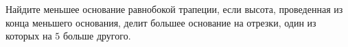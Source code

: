 \begin{ex}
	\begin{condition}
		Найдите меньшее основание равнобокой трапеции, если высота, проведенная из конца меньшего основания, делит большее основание на отрезки, один из которых на \( 5  \) больше другого.
	\end{condition}
\end{ex}